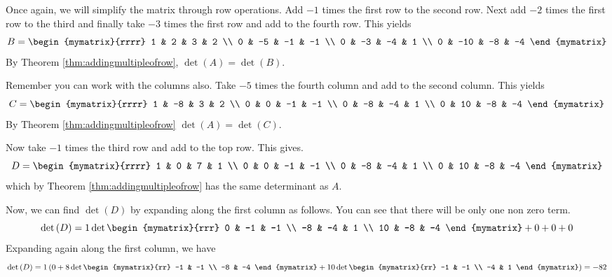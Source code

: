 \begin{solution} 
Once again, we will simplify the matrix through row operations. 
Add $-1$ times the first row to
the second row. Next add $-2$ times the first row to the third and finally take
$-3$ times the first row and add to the fourth row. This yields
\begin{equation*}
B = \begin{mymatrix}{rrrr}
1 & 2 & 3 & 2 \\
0 & -5 & -1 & -1 \\
0 & -3 & -4 & 1 \\
0 & -10 & -8 & -4
\end{mymatrix} 
\end{equation*}
By Theorem \ref{thm:addingmultipleofrow}, $\det \left(A\right) = \det \left(B\right)$. 

Remember you can work with the columns also. Take $-5$
times the fourth column and add to the second column. This yields
\begin{equation*}
C = \begin{mymatrix}{rrrr}
1 & -8 & 3 & 2 \\
0 & 0 & -1 & -1 \\
0 & -8 & -4 & 1 \\
0 & 10 & -8 & -4
\end{mymatrix}
\end{equation*}
By Theorem \ref{thm:addingmultipleofrow} $\det \left(A\right) = \det \left(C\right)$. 

Now take $-1$ times the third row and add to
the top row. This gives.
\begin{equation*}
D = \begin{mymatrix}{rrrr}
1 & 0 & 7 & 1 \\
0 & 0 & -1 & -1 \\
0 & -8 & -4 & 1 \\
0 & 10 & -8 & -4
\end{mymatrix}
\end{equation*}
which by Theorem \ref{thm:addingmultipleofrow} has the same determinant as $A$.

Now, we can find $\det \left(D\right)$ by expanding along the first column as follows. You can see that there will be only one non zero term.
\begin{equation*}
\det \left(D\right) = 1 \det \begin{mymatrix}{rrr}
0 & -1 & -1 \\
-8 & -4 & 1 \\
10 & -8 & -4
\end{mymatrix}
+ 0 + 0 + 0 
\end{equation*}
Expanding again along the first column, we have
\begin{equation*}
\det \left(D\right) 
=
1 \left ( 0 +  8\det \begin{mymatrix}{rr}
-1 & -1 \\
-8 & -4
\end{mymatrix} +10\det \begin{mymatrix}{rr}
-1 & -1 \\
-4 & 1
\end{mymatrix} \right) = -82
\end{equation*}


\end{solution}
